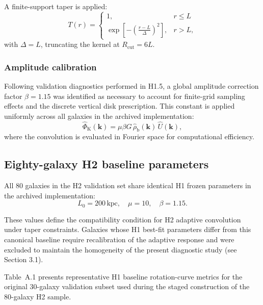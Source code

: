 \documentclass{aa}
\begin{document}
A finite-support taper is applied:
\begin{equation}
	T(r) = 
	\begin{cases}
		1, & r \le L \\
		\exp\left[-\left(\frac{r - L}{\Delta}\right)^2\right], & r > L,
	\end{cases}
	\label{eq:taper}
\end{equation}
with $\Delta = L$, truncating the kernel at $R_{\mathrm{cut}} = 6L$.

\subsubsection{Amplitude calibration}

Following validation diagnostics performed in H1.5, a global amplitude correction factor $\beta = 1.15$ was identified as necessary to account for finite-grid sampling effects and the discrete vertical disk prescription. This constant is applied uniformly across all galaxies in the archived implementation:
\begin{equation}
	\hat{\Phi}_{\mathrm{K}}(\mathbf{k}) = \mu \beta G\, \hat{\rho}_{\mathrm{b}}(\mathbf{k})\, \hat{U}(\mathbf{k}),
	\label{eq:fourier_beta}
\end{equation}
where the convolution is evaluated in Fourier space for computational efficiency.

\subsection{Eighty-galaxy H2 baseline parameters}

All 80 galaxies in the H2 validation set share identical H1 frozen parameters in the archived implementation:
\begin{equation}
	L_0 = 200\,\mathrm{kpc}, \quad \mu = 10, \quad \beta = 1.15.
	\label{eq:h2_baseline_params}
\end{equation}

These values define the compatibility condition for H2 adaptive convolution under taper constraints. Galaxies whose H1 best-fit parameters differ from this canonical baseline require recalibration of the adaptive response and were excluded to maintain the homogeneity of the present diagnostic study (see Section 3.1).

Table~A.1 presents representative H1 baseline rotation-curve metrics for the original 30-galaxy validation subset used during the staged construction of the 80-galaxy H2 sample.
\end{document}
